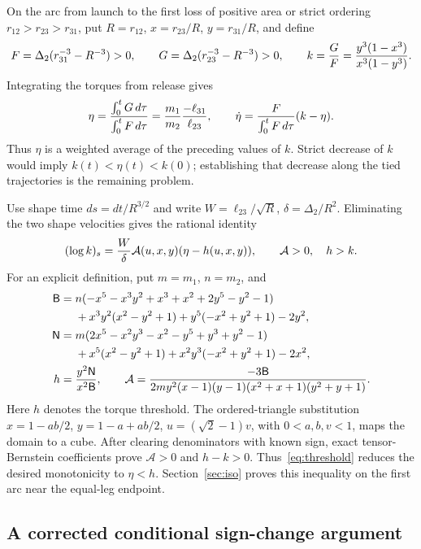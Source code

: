 On the arc from launch to the first loss of positive area or strict ordering
$r_{12}>r_{23}>r_{31}$, put
$R=r_{12}$, $x=r_{23}/R$, $y=r_{31}/R$, and define
\[
 F=\Delta_2(r_{31}^{-3}-R^{-3})>0,\qquad
 G=\Delta_2(r_{23}^{-3}-R^{-3})>0,\qquad
 k={G\over F}={y^3(1-x^3)\over x^3(1-y^3)}.
\]
Integrating the torques from release gives
\begin{equation}\label{eq:history}
 \eta={\int_0^tG\,d\tau\over\int_0^tF\,d\tau}
 ={m_1\over m_2}{-\ell_{31}\over\ell_{23}},\qquad
 \dot\eta={F\over\int_0^tF\,d\tau}(k-\eta).
\end{equation}
Thus $\eta$ is a weighted average of the preceding values of $k$.
Strict decrease of $k$ would imply $k(t)<\eta(t)<k(0)$; establishing that
decrease along the tied trajectories is the remaining problem.

Use shape time $ds=dt/R^{3/2}$ and write
$W=\ell_{23}/\sqrt R$, $\delta=\Delta_2/R^2$. Eliminating the two
shape velocities gives the rational identity
\begin{equation}\label{eq:threshold}
 (\log k)_s={W\over\delta}\mathcal A(u,x,y)(\eta-h(u,x,y)),
 \qquad \mathcal A>0,\quad h>k.
\end{equation}
For an explicit definition, put $m=m_1$, $n=m_2$, and
\[
\begin{aligned}
 \mathsf B={}&n(-x^5-x^3y^2+x^3+x^2+2y^5-y^2-1)\\
 &+x^3y^2(x^2-y^2+1)+y^5(-x^2+y^2+1)-2y^2,\\
 \mathsf N={}&m(2x^5-x^2y^3-x^2-y^5+y^3+y^2-1)\\
 &+x^5(x^2-y^2+1)+x^2y^3(-x^2+y^2+1)-2x^2,\\
 h={}&{y^2\mathsf N\over x^2\mathsf B},\qquad
 \mathcal A={-3\mathsf B\over
 2my^2(x-1)(y-1)(x^2+x+1)(y^2+y+1)}.
\end{aligned}
\]
Here $h$ denotes the torque threshold. The ordered-triangle substitution
$x=1-ab/2$, $y=1-a+ab/2$, $u=(\sqrt2-1)v$, with $0<a,b,v<1$,
maps the domain to a cube. After clearing denominators with known sign,
exact tensor-Bernstein coefficients prove $\mathcal A>0$ and $h-k>0$.
Thus~\eqref{eq:threshold} reduces the desired monotonicity to
$\eta<h$. Section~\ref{sec:iso} proves this inequality on the first
arc near the equal-leg endpoint.

\subsection{A corrected conditional sign-change argument}

